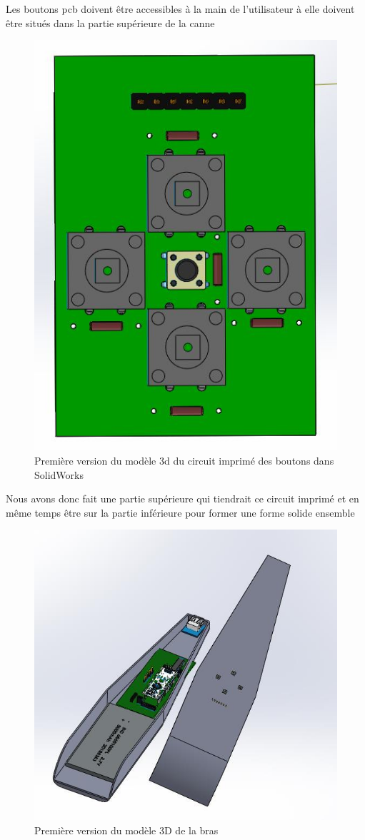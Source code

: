 \FloatBarrier

Les boutons pcb doivent être accessibles à la main de l’utilisateur à elle doivent être situés dans la partie supérieure de la canne

\begin{figure}[!htbp]
    \centering
    \includegraphics[width=.45\linewidth]{assets/conception1/img153.jpg}
    \caption{Première version du modèle 3d du circuit imprimé des boutons dans SolidWorks}
\end{figure}

\FloatBarrier

Nous avons donc fait une partie supérieure qui tiendrait ce circuit imprimé et en même temps être sur la partie inférieure pour former une forme solide ensemble

\begin{figure}[!htbp]
    \centering
    \includegraphics[width=.9\linewidth]{assets/conception1/img154.jpg}
    \caption{Première version du modèle 3D de la bras}
\end{figure}


